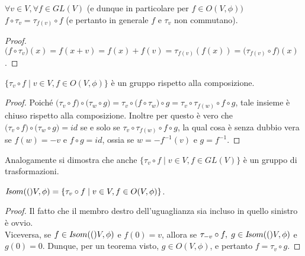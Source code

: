 \documentclass[a4paper,12pt]{article}
\newcommand{\Got}[1]{#1}
\newcommand{\got}[1]{{#1}}
\begin{document}
 \begin{lemma}
 \Got{}$\got{\forall v\in V, \forall f\in GL(V)}$ \Got{(e dunque in particolare per} 
 $\got{f\in O(V,\phi))}$\\
 $\got{f}\circ\got{\tau_v=\tau_{f(v)}}\circ\got{ f}$ \Got{(e pertanto in generale} $\got{f}$ \Got{e} $\got{\tau_v}$ \Got{non commutano)}.
 \end{lemma}
 
 \begin{proof}
 \Got{}$\got{(f}\circ\got{\tau_v)(x)=f(x+v)=f(x)+f(v)=\tau_{f(v)}(f(x))=(\tau_{f(v)}}\circ\got{ f)(x)}$.
  \end{proof}
 
 \begin{proposition}
 \Got{}$\got{\{\tau_v}\circ\got{ f\;|\;v\in V,f\in O(V,\phi)\}}$ \Got{è un gruppo rispetto alla composizione.}
 \end{proposition}
 
 \begin{proof}
 \Got{Poiché}  $\got{(\tau_v}\circ\got{ f)}\circ\got{(\tau_w}\circ\got{ g)=\tau_v}\circ\got{(f}\circ\got{\tau_w)}\circ\got{ g=
 \tau_v}\circ\got{\tau_{f(w)}}\circ\got{ f}\circ\got{ g}$, \Got{tale insieme è chiuso rispetto alla composizione.
 Inoltre per questo è vero che} $\got{(\tau_v}\circ\got{ f)}\circ\got{(\tau_w}\circ\got{ g)=id}$ \Got{se e solo se} $\got{\tau_v}\circ\got{\tau_{f(w)}}\circ\got{ f}\circ\got{ g}$,
 \Got{la qual cosa è senza dubbio vera se} $\got{f(w)=-v}$ \Got{ e}  $\got{f}\circ\got{ g=id}$, \Got{ossia se} $\got{w=-f^{-1}(v)}$ \Got{ e }
 $\got{g=f^{-1}}$.
  \end{proof}
 
 \begin{remark}
 \Got{Analogamente si dimostra che anche} $\got{\{\tau_v}\circ\got{ f\;|\;v\in V,f\in GL(V)\}}$ 
 \Got{è un gruppo di trasformazioni.}
 \end{remark}
 
 \begin{theorem}
 \label{thm:isometrie}
 \Got{}$\got{\Isom(V,\phi)=\{\tau_v}\circ\got{ f\;|\;v\in V,f\in O(V,\phi)\}}$.
 \end{theorem}
 
 \begin{proof}
 \Got{Il fatto che il membro destro dell'uguaglianza sia incluso in quello sinistro è ovvio.\\
 Viceversa, se} $\got{f\in \Isom(V,\phi)}$ \Got{ e } $\got{f(0)=v}$, \Got{allora se } $\got{\tau_{-v}}\circ\got{ f,\; g\in \Isom(V,\phi)}$ \Got{e}
 $\got{g(0)=0}$. \Got{Dunque, per un teorema visto,} $\got{g\in O(V,\phi)}$, \Got{e pertanto} $\got{f=\tau_v}\circ\got{ g}$.
  \end{proof}
 
\end{document}
